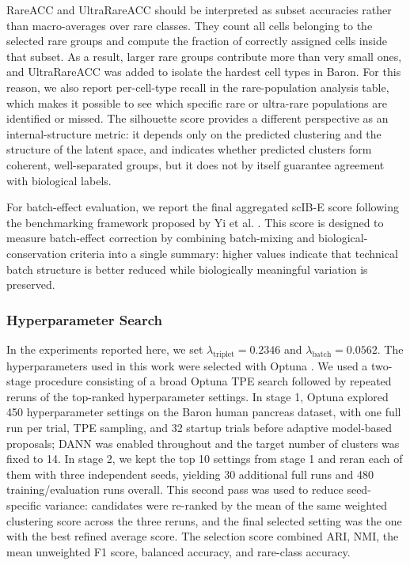 \documentclass[11pt,a4paper]{article}
\begin{document}
RareACC and UltraRareACC should be interpreted as subset accuracies
rather than macro-averages over rare classes. They count all cells
belonging to the selected rare groups and compute the fraction of
correctly assigned cells inside that subset. As a result, larger rare
groups contribute more than very small ones, and UltraRareACC was added
to isolate the hardest cell types in Baron. For this reason, we also
report per-cell-type recall in the rare-population analysis table,
which makes it possible to see which specific rare or ultra-rare
populations are identified or missed. The silhouette score provides a
different perspective as an internal-structure metric: it depends only
on the predicted clustering and the structure of the latent space, and indicates whether
predicted clusters form coherent, well-separated groups, but it does not by itself
guarantee agreement with biological labels.

For batch-effect evaluation, we report the final aggregated scIB-E score following the benchmarking framework proposed by Yi et al. \cite{yi2025}. This score is designed to measure batch-effect correction by combining batch-mixing and biological-conservation criteria into a single summary: higher values indicate that technical batch structure is better reduced while biologically meaningful variation is preserved.


\subsubsection*{Hyperparameter Search}
In the experiments reported
here, we set $\lambda_{\mathrm{triplet}} = 0.2346$ and
$\lambda_{\mathrm{batch}} = 0.0562$.
The hyperparameters used in this work were selected with Optuna
\cite{akiba2019}.
We used a two-stage procedure consisting of a broad Optuna TPE search followed by repeated reruns of the top-ranked hyperparameter settings. In stage 1, Optuna explored 450 hyperparameter settings on the Baron human pancreas dataset, with one full run per trial, TPE sampling, and 32 startup trials before adaptive model-based proposals; DANN was enabled throughout and the target number of clusters was fixed to 14. In stage 2, we kept the top 10 settings from stage 1 and reran each of them with three independent seeds, yielding 30 additional full runs and 480 training/evaluation runs overall. This second pass was used to reduce seed-specific variance: candidates were re-ranked by the mean of the same weighted clustering score across the three reruns, and the final selected setting was the one with the best refined average score. The selection score combined ARI, NMI, the mean unweighted F1 score, balanced accuracy, and rare-class accuracy.
\end{document}
